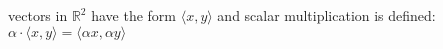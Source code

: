 \documentclass[preview]{standalone}
\begin{document}
\begin{center}
vectors in $\mathbb{R}^2$ have the form $\langle x, y\rangle$ and scalar multiplication is defined: $\alpha \cdot \langle x, y\rangle = \langle \alpha x, \alpha y \rangle$
\end{center}
\end{document}
